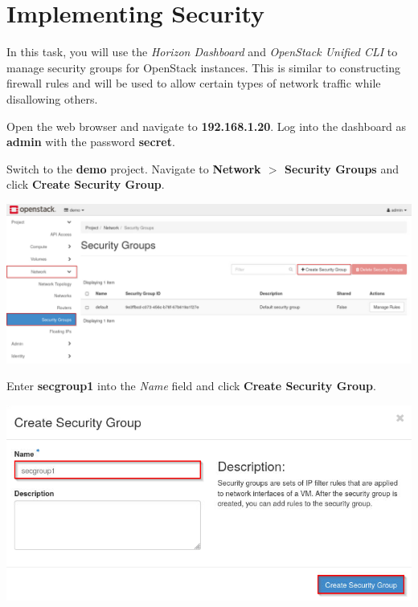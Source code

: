 \documentclass[letterpaper, 12pt]{article}
\begin{document}
\section{Implementing Security}\label{sec:implementing-security}
In this task, you will use the \textit{Horizon Dashboard} and \textit{OpenStack Unified CLI} to manage security groups for OpenStack instances.
This is similar to constructing firewall rules and will be used to allow certain types of network traffic while disallowing others.

\begin{enumerate}
    \begin{labstep}
        Open the web browser and navigate to \textbf{192.168.1.20}.
        Log into the dashboard as \textbf{admin} with the password \textbf{secret}.
    \end{labstep}

    \begin{labstep}
        Switch to the \textbf{demo} project.
        Navigate to \textbf{Network $>$ Security Groups} and click \textbf{Create Security Group}.

        \begin{center}
            \includegraphics[width=\linewidth]{images/part5/step2.png}
        \end{center}
    \end{labstep}

    \begin{labstep}
        Enter \textbf{secgroup1} into the \textit{Name} field and click \textbf{Create Security Group}.

        \begin{center}
            \includegraphics[width=\linewidth]{images/part5/step3.png}
        \end{center}
    \end{labstep}


\end{enumerate}
\end{document}
